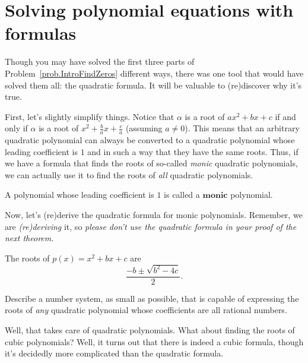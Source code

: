 \section{Solving polynomial equations with formulas}
Though you may have solved the first three parts of Problem~\ref{prob.IntroFindZeros} different ways, there was one tool that would have solved them all: the quadratic formula. It will be valuable to (re)discover why it's true. 

First, let's slightly simplify things. Notice that $\alpha$ is a root of $ax^2 + bx + c$ if and only if $\alpha$ is a root of $x^2 + \frac{b}{a}x + \frac{c}{a}$ (assuming $a\neq 0$). This means that an arbitrary quadratic polynomial can always be converted to a quadratic polynomial whose leading coefficient is $1$ and in such a way that they have the same roots. Thus, if we have a formula that finds the roots of so-called \emph{monic} quadratic polynomials, we can actually use it to find the roots of \emph{all} quadratic polynomials.

\begin{definition}
A polynomial whose leading coefficient is $1$ is called a $\textbf{monic}$ polynomial.
\end{definition}

Now, let's (re)derive the quadratic formula for monic polynomials. Remember, we are \emph{(re)deriving} it, so \emph{please don't use the quadratic formula in your proof of the next theorem.}

\begin{theorem}\label{thm.MonicQuadratic}
The roots of $p(x) = x^2 + bx + c$ are \[\frac{-b\pm\sqrt{b^2 - 4c}}{2}.\]
\end{theorem}

\begin{problem}
Describe a number system, as small as possible, that is capable of expressing the roots of \emph{any} quadratic polynomial whose coefficients are all rational numbers.
\end{problem}

Well, that takes care of quadratic polynomials. What about finding the roots of cubic polynomials? Well, it turns out that there is indeed a cubic formula, though it's decidedly more complicated than the quadratic formula. 

